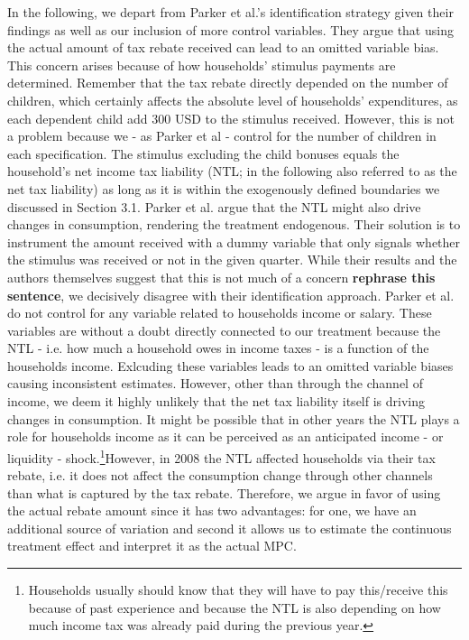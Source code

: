 In the following, we depart from Parker et al.'s identification strategy given their findings as well as our inclusion of more control variables. They argue that using the actual amount of tax rebate received can lead to an omitted variable bias. This concern arises because of how households' stimulus payments are determined. Remember that the tax rebate directly depended on the number of children, which certainly affects the absolute level of households' expenditures, as each dependent child add 300 USD to the stimulus received. However, this is not a problem because we - as Parker et al - control for the number of children in each specification. The stimulus excluding the child bonuses equals the household's net income tax liability (NTL; in the following also referred to as the net tax liability) as long as it is within the exogenously defined boundaries we discussed in Section 3.1. Parker et al. argue that the NTL might also drive changes in consumption, rendering the treatment endogenous. Their solution is to instrument the amount received with a dummy variable that only signals whether the stimulus was received or not in the given quarter. While their results and the authors themselves suggest that this is not much of a concern \textbf{rephrase this sentence}, we decisively disagree with their identification approach. Parker et al. do not control for any variable related to households income or salary. These variables are without a doubt directly connected to our treatment because the NTL - i.e. how much a household owes in income taxes - is a function of the households income. Exlcuding these variables leads to an omitted variable biases causing inconsistent estimates. However, other than through the channel of income, we deem it highly unlikely that the net tax liability itself is driving changes in consumption. It might be possible that in other years the NTL plays a role for households income as it can be perceived as an anticipated income - or liquidity - shock.\footnote{Households usually should know that they will have to pay this/receive this because of past experience and because the NTL is also depending on how much income tax was already paid during the previous year.}However, in 2008 the NTL affected households via their tax rebate, i.e. it does not affect the consumption change through other channels than what is captured by the tax rebate. Therefore, we argue in favor of using the actual rebate amount since it has two advantages: for one, we have an additional source of variation and second it allows us to estimate the continuous treatment effect and interpret it as the actual MPC. 

